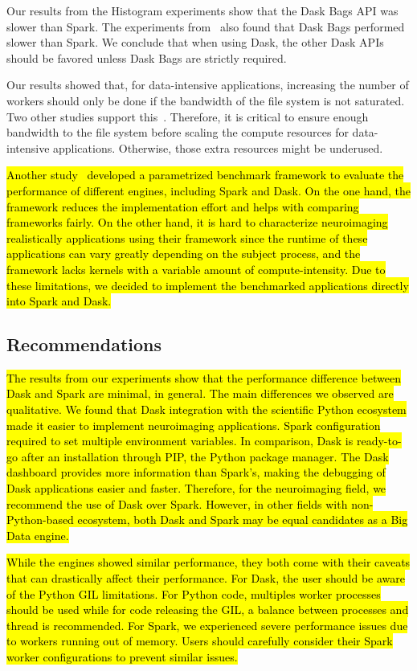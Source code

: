 \documentclass[AMA,STIX1COL]{WileyNJD-v2}
\newcommand{\HL}[1]{\hl{#1}}
\begin{document}
Our results from the Histogram experiments show that the Dask Bags API was slower than Spark.
The experiments from~\cite{10.1145/3225058.3225128} also found that Dask Bags performed slower than Spark.
We conclude that when using Dask, the other Dask APIs should be favored unless Dask Bags are strictly required.
																	
Our results showed that, for data-intensive applications, increasing the number of workers should only be done if the bandwidth of the file system is not saturated.
Two other studies support this~\cite{8943502, 8588652}.
Therefore, it is critical to ensure enough bandwidth to the file system before scaling the compute resources for data-intensive applications.
Otherwise, those extra resources might be underused.

\HL{
	Another study~{\cite{9355308}} developed a parametrized benchmark framework
	to evaluate the performance of different engines, including Spark and Dask.
	On the one hand, the framework reduces the implementation effort and helps with
	comparing frameworks fairly.
	On the other hand, it is hard to characterize neuroimaging realistically
	applications using their framework since the runtime of these applications can vary
	greatly depending on the subject process, and the framework lacks kernels with
	a variable amount of compute-intensity.
	Due to these limitations, we decided to implement the benchmarked applications
	directly into Spark and Dask.
}
				
\subsection{Recommendations}
\HL{
	The results from our experiments show that the performance difference between
	Dask and Spark are minimal, in general. 
	The main differences we observed are qualitative.
	We found that Dask integration with the scientific Python ecosystem made it
	easier to implement neuroimaging applications.
	Spark configuration required to set multiple environment variables.
	In comparison, Dask is ready-to-go after an installation through PIP, the Python package manager.
	The Dask dashboard provides more information than Spark's, making
	the debugging of Dask applications easier and faster.
	Therefore, for the neuroimaging field, we recommend the use of Dask over Spark.
	However, in other fields with non-Python-based ecosystem, both Dask and Spark
	may be equal candidates as a Big Data engine.
}

\HL{
	While the engines showed similar performance, they both come with their caveats that
	can drastically affect their performance.
	For Dask, the user should be aware of the Python GIL limitations.
	For Python code, multiples worker processes should be used while for code releasing the
	GIL, a balance between processes and thread is recommended.
	For Spark, we experienced severe performance issues due to workers running out of memory.
	Users should carefully consider their Spark worker configurations to prevent similar issues.
}
											
\end{document}
